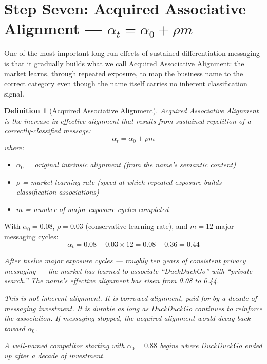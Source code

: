 \documentclass[12pt, openany]{book}
\theoremstyle{thmstyle}
\theoremstyle{defstyle}
\newtheorem{definition}{Definition}[chapter]
\begin{document}
\section{Step Seven: Acquired Associative Alignment --- $\alpha_t = \alpha_0 + \rho m$}

One of the most important long-run effects of sustained differentiation messaging is that it gradually builds what we call Acquired Associative Alignment: the market learns, through repeated exposure, to map the business name to the correct category even though the name itself carries no inherent classification signal.

\begin{definition}[Acquired Associative Alignment]
Acquired Associative Alignment is the increase in effective alignment that results from sustained repetition of a correctly-classified message:
\begin{equation}
\alpha_t = \alpha_0 + \rho m
\label{eq:acquired_alignment}
\end{equation}
where:
\begin{itemize}[leftmargin=1.5em]
  \item $\alpha_0$ = original intrinsic alignment (from the name's semantic content)
  \item $\rho$ = market learning rate (speed at which repeated exposure builds classification associations)
  \item $m$ = number of major exposure cycles completed
\end{itemize}
\end{definition}

\begin{calcbox}
With $\alpha_0 = 0.08$, $\rho = 0.03$ (conservative learning rate), and $m = 12$ major messaging cycles:
\[
\alpha_t = 0.08 + 0.03 \times 12 = 0.08 + 0.36 = \mathbf{0.44}
\]

\textit{After twelve major exposure cycles --- roughly ten years of consistent privacy messaging --- the market has learned to associate ``DuckDuckGo'' with ``private search.'' The name's effective alignment has risen from 0.08 to 0.44.}

\textit{This is not inherent alignment. It is borrowed alignment, paid for by a decade of messaging investment. It is durable as long as DuckDuckGo continues to reinforce the association. If messaging stopped, the acquired alignment would decay back toward $\alpha_0$.}

\textit{A well-named competitor starting with $\alpha_0 = 0.88$ begins where DuckDuckGo ended up after a decade of investment.}
\end{calcbox}
\end{document}
